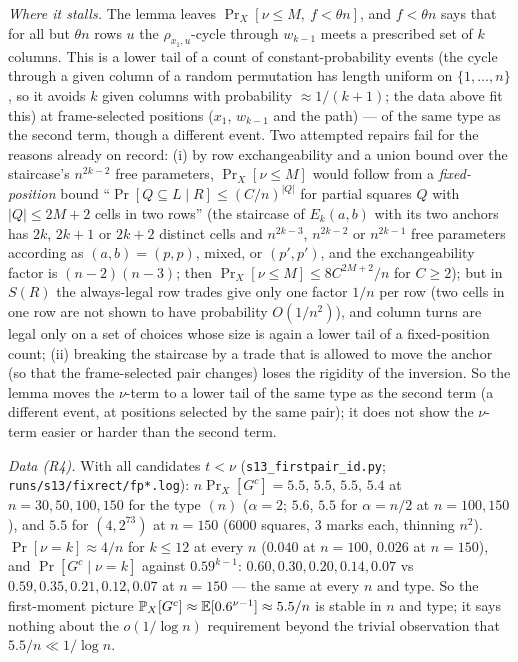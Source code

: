 \emph{Where it stalls.}  The lemma leaves
$\Pr_X[\nu\le M,\ f<\theta n]$, and $f<\theta n$ says that for all but
$\theta n$ rows $u$ the $\rho_{x_1,u}$-cycle through $w_{k-1}$ meets a
prescribed set of $k$ columns.  This is a lower tail of a count of
constant-probability events (the cycle through a given column of a
random permutation has length uniform on $\{1,\dots,n\}$, so it avoids
$k$ given columns with probability $\approx1/(k+1)$; the data above fit
this) at frame-selected positions ($x_1$, $w_{k-1}$ and the path) ---
of the same type as the second term, though a different event.  Two attempted repairs fail for the reasons already on
record: (i) by row exchangeability and a union bound over the
staircase's $n^{2k-2}$ free parameters, $\Pr_X[\nu\le M]$ would follow
from a \emph{fixed-position} bound ``$\Pr[Q\subseteq L\mid R]\le(C/n)^{|Q|}$
for partial squares $Q$ with $|Q|\le2M+2$ cells in two rows'' (the
staircase of $E_k(a,b)$ with its two anchors has $2k$, $2k+1$ or $2k+2$
distinct cells and $n^{2k-3}$, $n^{2k-2}$ or $n^{2k-1}$ free parameters
according as $(a,b)=(p,p)$, mixed, or $(p',p')$, and the exchangeability
factor is $(n-2)(n-3)$; then $\Pr_X[\nu\le M]\le8C^{2M+2}/n$ for
$C\ge2$); but in $S(R)$ the always-legal row
trades give only one factor $1/n$ per row (two cells in one row are
not shown to have probability $O(1/n^2)$), and column turns are legal
only on a set of choices whose size is again a lower tail of a
fixed-position count; (ii) breaking the staircase by a trade that is
allowed to move the anchor (so that the frame-selected pair changes)
loses the rigidity of the inversion.  So the lemma moves the $\nu$-term to a lower tail of the same type
as the second term (a different event, at positions selected by the
same pair); it does not show the $\nu$-term easier or harder than the
second term.

\emph{Data (R4).}  With all candidates $t<\nu$ (\texttt{s13\_firstpair\_id.py};
\texttt{runs/s13/fixrect/fp*.log}): $n\Pr_X[G^c]=5.5,\,5.5,\,5.5,\,5.4$ at
$n=30,50,100,150$ for the type $(n)$ ($\alpha=2$; $5.6$, $5.5$ for
$\alpha=n/2$ at $n=100,150$), and $5.5$ for $(4,2^{73})$ at $n=150$
($6000$ squares, $3$ marks each, thinning $n^2$).  $\Pr[\nu=k]\approx4/n$
for $k\le12$ at every $n$ ($0.040$ at $n=100$, $0.026$ at $n=150$), and
$\Pr[G^c\mid\nu=k]$ against $0.59^{k-1}$: $0.60,0.30,0.20,0.14,0.07$ vs
$0.59,0.35,0.21,0.12,0.07$ at $n=150$ --- the same at every $n$ and type.
So the first-moment picture $\mathbb{P}_X[G^c]\approx\mathbb{E}[0.6^{\nu-1}]\approx5.5/n$
is stable in $n$ and type; it says nothing about the $o(1/\log n)$
requirement beyond the trivial observation that $5.5/n\ll1/\log n$.

